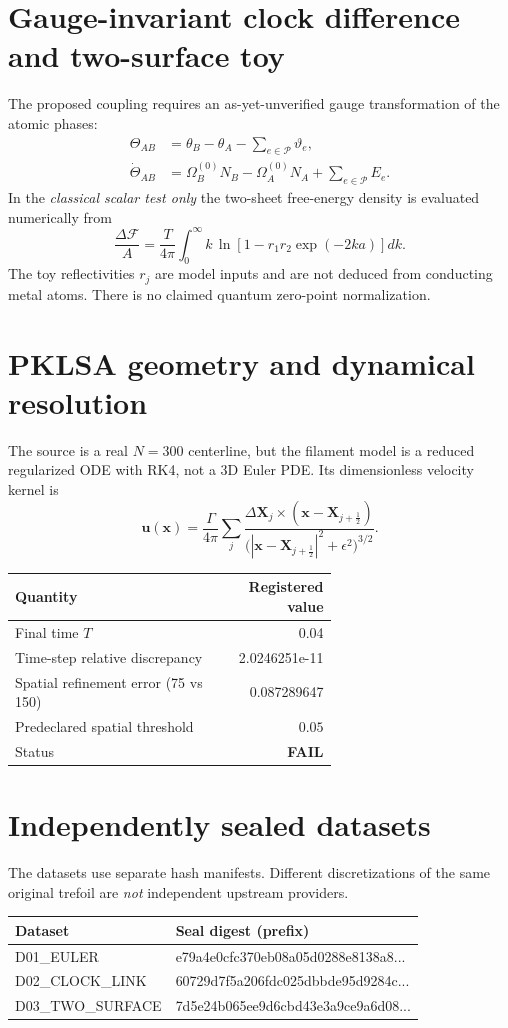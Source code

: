 \documentclass[10pt,a4paper]{article}
\begin{document}
\section{Gauge-invariant clock difference and two-surface toy}
The proposed coupling requires an as-yet-unverified gauge transformation of the atomic phases:
\begin{align}
\Theta_{AB}&=\theta_B-\theta_A-\sum_{e\in\mathcal P}\vartheta_e,\\
\dot\Theta_{AB}&=\Omega_B^{(0)}N_B-\Omega_A^{(0)}N_A
+\sum_{e\in\mathcal P}E_e.
\end{align}
In the \emph{classical scalar test only} the two-sheet free-energy density is evaluated numerically from
\[
\frac{\Delta\mathcal F}{A}=\frac{T}{4\pi}\int_0^\infty k\,
\ln\!\left[1-r_1r_2\exp(-2ka)\right]dk.
\]
The toy reflectivities $r_j$ are model inputs and are not deduced from conducting metal atoms. There is no claimed quantum zero-point normalization.
\section{PKLSA geometry and dynamical resolution}
The source is a real $N=300$ centerline, but the filament model is a reduced regularized ODE with RK4, not a 3D Euler PDE. Its dimensionless velocity kernel is
\[
\mathbf u(\mathbf x)=\frac{\Gamma}{4\pi}\sum_j
\frac{\Delta\mathbf X_j\times(\mathbf x-\mathbf X_{j+\frac12})}
{\big(|\mathbf x-\mathbf X_{j+\frac12}|^2+\epsilon^2\big)^{3/2}}.
\]
\begin{tabular}{@{}p{0.64\linewidth}r@{}}\toprule
Quantity & Registered value \\\midrule
Final time $T$ & 0.04 \\
Time-step relative discrepancy & 2.0246251e-11 \\
Spatial refinement error (75 vs 150) & 0.087289647 \\
Predeclared spatial threshold & $0.05$ \\
Status & \textbf{FAIL} \\
\bottomrule\end{tabular}
\section{Independently sealed datasets}
The datasets use separate hash manifests. Different discretizations of the same original trefoil are \emph{not} independent upstream providers.
\par\medskip
\begin{tabular}{@{}ll@{}}\toprule Dataset & Seal digest (prefix) \\\midrule
D01\_EULER & e79a4e0cfc370eb08a05d0288e8138a8...\\
D02\_CLOCK\_LINK & 60729d7f5a206fdc025dbbde95d9284c...\\
D03\_TWO\_SURFACE & 7d5e24b065ee9d6cbd43e3a9ce9a6d08...\\
\bottomrule\end{tabular}
\end{document}
